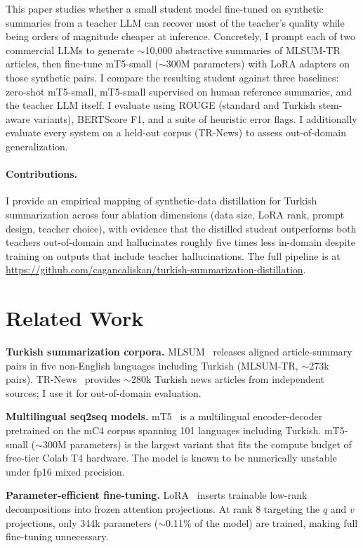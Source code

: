 \documentclass{llncs}
\begin{document}
This paper studies whether a small student model fine-tuned on synthetic summaries from a teacher LLM can recover most of the teacher's quality while being orders of magnitude cheaper at inference. Concretely, I prompt each of two commercial LLMs to generate $\sim$10{,}000 abstractive summaries of MLSUM-TR articles, then fine-tune mT5-small (\(\sim\)300M parameters) with LoRA adapters on those synthetic pairs. I compare the resulting student against three baselines: zero-shot mT5-small, mT5-small supervised on human reference summaries, and the teacher LLM itself. I evaluate using ROUGE (standard and Turkish stem-aware variants), BERTScore F1, and a suite of heuristic error flags. I additionally evaluate every system on a held-out corpus (TR-News) to assess out-of-domain generalization.

\paragraph{Contributions.} I provide an empirical mapping of synthetic-data distillation for Turkish summarization across four ablation dimensions (data size, LoRA rank, prompt design, teacher choice), with evidence that the distilled student outperforms both teachers out-of-domain and hallucinates roughly five times less in-domain despite training on outputs that include teacher hallucinations. The full pipeline is at \url{https://github.com/cagancaliskan/turkish-summarization-distillation}.

\section{Related Work}

\textbf{Turkish summarization corpora.} MLSUM~\cite{scialom2020mlsum} releases aligned article-summary pairs in five non-English languages including Turkish (MLSUM-TR, $\sim$273k pairs). TR-News~\cite{baykara2022trnews} provides $\sim$280k Turkish news articles from independent sources; I use it for out-of-domain evaluation.

\textbf{Multilingual seq2seq models.} mT5~\cite{xue2021mt5} is a multilingual encoder-decoder pretrained on the mC4 corpus spanning 101 languages including Turkish. mT5-small ($\sim$300M parameters) is the largest variant that fits the compute budget of free-tier Colab T4 hardware. The model is known to be numerically unstable under fp16 mixed precision.

\textbf{Parameter-efficient fine-tuning.} LoRA~\cite{hu2021lora} inserts trainable low-rank decompositions into frozen attention projections. At rank 8 targeting the $q$ and $v$ projections, only 344k parameters ($\sim$0.11\% of the model) are trained, making full fine-tuning unnecessary.
\end{document}
